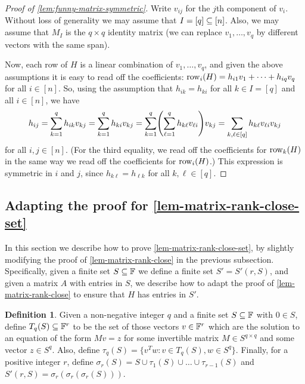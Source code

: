 \documentclass{daj}
\theoremstyle{plain}
\theoremstyle{plain}
\theoremstyle{plain}
\theoremstyle{plain}
\theoremstyle{definition}
\newtheorem{defn}[thm]{Definition}
\theoremstyle{plain}
\theoremstyle{plain}
\theoremstyle{definition}
\theoremstyle{definition}
\theoremstyle{plain}
\let\originalleft\left
\let\originalright\right
\renewcommand{\left}{\mathopen{}\mathclose\bgroup\originalleft}
\renewcommand{\right}{\aftergroup\egroup\originalright}
\begin{document}
\begin{proof}
[Proof of \cref{lem:funny-matrix-symmetric}]
Write $v_{ij}$ for the $j$th component of $v_i$. Without loss of generality we may assume that $I=[q]\subseteq [n]$. Also, we may assume that $M_I$ is the $q\times q$ identity matrix (we can replace $v_1,\dots,v_q$ by different vectors with the same span).

Now, each row of $H$ is a linear combination of $v_1,\dots,v_q$, and given the above assumptions it is easy to read off the coefficients: $\operatorname{row}_i(H)=h_{i1}v_1+\dots +h_{iq}v_q$ for all $i\in [n]$. So, using the assumption that $h_{ik}=h_{ki}$ for all $k\in I=[q]$ and all $i\in [n]$, we have
\[h_{ij}=\sum_{k=1}^q h_{ik}v_{kj}=\sum_{k=1}^q h_{ki}v_{kj}=\sum_{k=1}^q\left(\sum_{\ell=1}^q h_{k\ell}v_{\ell i}\right) v_{kj}=\sum_{ k,\ell\in [q]}h_{k\ell}v_{\ell i} v_{kj}\]
for all $i,j\in [n]$. (For the third equality, we read off the coefficients for $\operatorname{row}_k(H)$ in the same way we read off the coefficients for $\operatorname{row}_i(H)$.) This expression is symmetric in $i$ and $j$, since $h_{k\ell}=h_{\ell k}$ for all $k,\ell\in [q]$.
\end{proof}

\subsection{Adapting the proof for \texorpdfstring{\cref{lem-matrix-rank-close-set}}{Lemma~\ref{lem-matrix-rank-close-set}}\label{sec:lem-matrix-rank-close-set}}

In this section we describe how to prove \cref{lem-matrix-rank-close-set}, by slightly modifying the proof of \cref{lem-matrix-rank-close} in the previous subsection. Specifically, given a finite set $S\subseteq \mathbb{F}$ we define a finite set $S'=S'(r,S)$, and given a matrix $A$ with entries in $S$, we describe how to adapt the proof of \cref{lem-matrix-rank-close} to ensure that $H$ has entries in $S'$. 

\begin{defn}
\label{def:S'}
Given a non-negative integer $q$ and a finite set $S\subseteq \mathbb{F}$ with $0\in S$, define $T_q(S)\subseteq \mathbb{F}^r$ to be the set of those vectors $v\in \mathbb{F}^r$ which are the solution to an equation of the form $Mv=z$ for some invertible matrix $M\in S^{q\times q}$ and some vector $z\in S^q$. Also, define
$\tau_q(S)=\lbrace v^T w: v\in T_q(S), w\in S^q\rbrace$. Finally, for a positive integer $r$, define $\sigma_r(S)=S\cup \tau_1(S)\cup\dots\cup \tau_{r-1}(S)$ and $S'(r,S)=\sigma_r(\sigma_r(\sigma_r(S)))$.
\end{defn}
\end{document}
